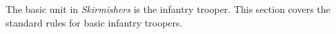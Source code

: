 The basic unit in \emph{Skirmishers} is the infantry trooper.
This section covers the standard rules for basic infantry troopers.
